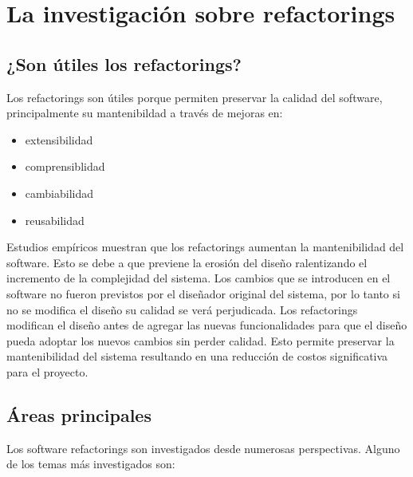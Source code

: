 \section{La investigación sobre refactorings}

\subsection{¿Son útiles los refactorings?}
Los refactorings son útiles porque permiten preservar la calidad del software,
principalmente su mantenibildad a través de mejoras en:

\begin{itemize}
    \item extensibilidad
    \item comprensiblidad
    \item cambiabilidad
    \item reusabilidad
\end{itemize}

Estudios empíricos muestran que los refactorings aumentan la mantenibilidad del
software. Esto se debe a que previene la erosión del diseño ralentizando el
incremento de la complejidad del sistema.  Los cambios que se introducen en el
software no fueron previstos por el diseñador original del sistema, por lo tanto
si no se modifica el diseño su calidad se verá perjudicada. Los refactorings
modifican el diseño antes de agregar las nuevas funcionalidades para que el
diseño pueda adoptar los nuevos cambios sin perder calidad. Esto permite
preservar la mantenibilidad del sistema resultando en una reducción de costos
significativa para el proyecto.


\subsection{Áreas principales}
Los software refactorings son investigados desde numerosas perspectivas. Alguno
de los temas más investigados son:

